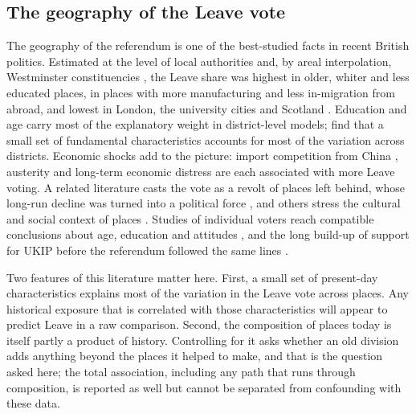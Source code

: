 \documentclass[11pt,a4paper]{article}
\begin{document}
\subsection{The geography of the Leave vote}
The geography of the referendum is one of the best-studied facts in recent British politics. Estimated at the level of local authorities and, by areal interpolation, Westminster constituencies \citep{hanretty2017}, the Leave share was highest in older, whiter and less educated places, in places with more manufacturing and less in-migration from abroad, and lowest in London, the university cities and Scotland \citep{becker2017,goodwin2016,harris2016,alabrese2019}. Education and age carry most of the explanatory weight in district-level models; \citet{becker2017} find that a small set of fundamental characteristics accounts for most of the variation across districts. Economic shocks add to the picture: import competition from China \citep{colantone2018}, austerity \citep{fetzer2019} and long-term economic distress \citep{carreras2019} are each associated with more Leave voting. A related literature casts the vote as a revolt of places left behind, whose long-run decline was turned into a political force \citep{rodriguezpose2018,mccann2020,dijkstra2020,lee2018}, and others stress the cultural and social context of places \citep{abreu2020,jennings2016,furlong2019,johnston2018}. Studies of individual voters reach compatible conclusions about age, education and attitudes \citep{hobolt2016,clarke2017}, and the long build-up of support for UKIP before the referendum followed the same lines \citep{ford2014}.

Two features of this literature matter here. First, a small set of present-day characteristics explains most of the variation in the Leave vote across places. Any historical exposure that is correlated with those characteristics will appear to predict Leave in a raw comparison. Second, the composition of places today is itself partly a product of history. Controlling for it asks whether an old division adds anything beyond the places it helped to make, and that is the question asked here; the total association, including any path that runs through composition, is reported as well but cannot be separated from confounding with these data.
\end{document}
